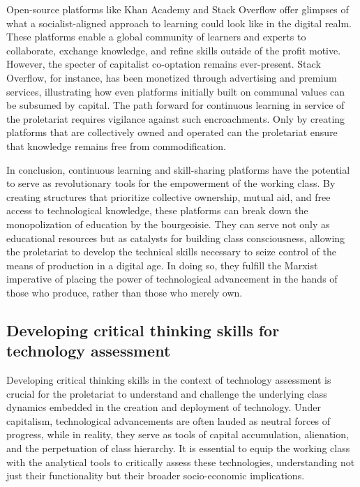 \begin{refsection}
Open-source platforms like Khan Academy and Stack Overflow offer glimpses of what a socialist-aligned approach to learning could look like in the digital realm. These platforms enable a global community of learners and experts to collaborate, exchange knowledge, and refine skills outside of the profit motive. However, the specter of capitalist co-optation remains ever-present. Stack Overflow, for instance, has been monetized through advertising and premium services, illustrating how even platforms initially built on communal values can be subsumed by capital. The path forward for continuous learning in service of the proletariat requires vigilance against such encroachments. Only by creating platforms that are collectively owned and operated can the proletariat ensure that knowledge remains free from commodification.

In conclusion, continuous learning and skill-sharing platforms have the potential to serve as revolutionary tools for the empowerment of the working class. By creating structures that prioritize collective ownership, mutual aid, and free access to technological knowledge, these platforms can break down the monopolization of education by the bourgeoisie. They can serve not only as educational resources but as catalysts for building class consciousness, allowing the proletariat to develop the technical skills necessary to seize control of the means of production in a digital age. In doing so, they fulfill the Marxist imperative of placing the power of technological advancement in the hands of those who produce, rather than those who merely own.

\subsection{Developing critical thinking skills for technology assessment}

Developing critical thinking skills in the context of technology assessment is crucial for the proletariat to understand and challenge the underlying class dynamics embedded in the creation and deployment of technology. Under capitalism, technological advancements are often lauded as neutral forces of progress, while in reality, they serve as tools of capital accumulation, alienation, and the perpetuation of class hierarchy. It is essential to equip the working class with the analytical tools to critically assess these technologies, understanding not just their functionality but their broader socio-economic implications.


\end{refsection}
